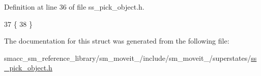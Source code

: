 Definition at line 36 of file ss\+\_\+pick\+\_\+object.\+h.


\begin{DoxyCode}
37             \{
38             \}
\end{DoxyCode}


The documentation for this struct was generated from the following file\+:\begin{DoxyCompactItemize}
\item 
smacc\+\_\+sm\+\_\+reference\+\_\+library/sm\+\_\+moveit\+\_/include/sm\+\_\+moveit\+\_/superstates/\hyperlink{4_2include_2sm__moveit__4_2superstates_2ss__pick__object_8h}{ss\+\_\+pick\+\_\+object.\+h}\end{DoxyCompactItemize}
